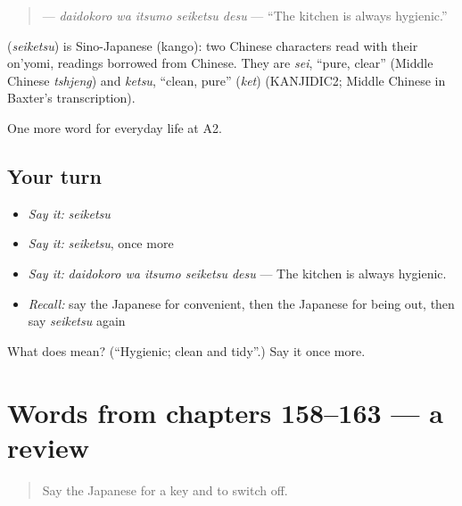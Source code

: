 \begin{quote}
\textbf{  } — \emph{daidokoro wa itsumo seiketsu desu} — \textquotedblleft{}The kitchen is always hygienic.\textquotedblright{}
\end{quote}

\begin{cousinweb}
\textbf{} (\emph{seiketsu}) is Sino-Japanese (kango): two Chinese characters read with their on'yomi, readings borrowed from Chinese. They are \emph{sei}, \textquotedblleft{}pure, clear\textquotedblright{} (Middle Chinese \emph{tshjeng}) and \emph{ketsu}, \textquotedblleft{}clean, pure\textquotedblright{} (\emph{ket}) (KANJIDIC2; Middle Chinese in Baxter's transcription).
\end{cousinweb}

\begin{grammarlens}[title={What you've built}]
One more word for everyday life at A2.
\end{grammarlens}

\subsection*{Your turn}
\begin{itemize}
\raggedright
  \item \emph{Say it:} \emph{seiketsu}
  \item \emph{Say it:} \emph{seiketsu}, once more
  \item \emph{Say it:} \emph{daidokoro wa itsumo seiketsu desu} — The kitchen is always hygienic.
  \item \emph{Recall:} say the Japanese for convenient, then the Japanese for being out, then say \emph{seiketsu} again
\end{itemize}

\begin{tcolorbox}[breakable,colback=teal!4,colframe=teal!35!black,title={Before you move on}]
What does  mean? (\textquotedblleft{}Hygienic; clean and tidy\textquotedblright{}.) Say it once more.
\end{tcolorbox}
\section[(dialogue)]{Words from chapters 158–163 — a review}

\label{lesson:JA-R163-review-158-163}



\begin{quote}
Say the Japanese for a key and to switch off.
\end{quote}


